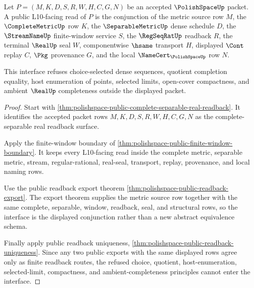 \begin{theorem}
\label{thm:polishspace-complete-separable-real-readback-public-interface}
Let $P=(M,K,D,S,R,W,H,C,G,N)$ be an accepted $\PolishSpaceUp$ packet. A public L10-facing read of $P$ is the conjunction of the metric source row $M$, the $\CompleteMetricUp$ row $K$, the $\SeparableMetricUp$ dense schedule $D$, the $\StreamNameUp$ finite-window service $S$, the $\RegSeqRatUp$ readback $R$, the terminal $\RealUp$ seal $W$, componentwise $\hsame$ transport $H$, displayed $\Cont$ replay $C$, $\Pkg$ provenance $G$, and the local $\NameCert_{\PolishSpaceUp}$ row $N$.

This interface refuses choice-selected dense sequences, quotient completion equality, host enumeration of points, selected limits, open-cover compactness, and ambient $\RealUp$ completeness outside the displayed packet.
\end{theorem}
\begin{proof}
Start with \autoref{thm:polishspace-public-complete-separable-real-readback}. It identifies the accepted packet rows $M,K,D,S,R,W,H,C,G,N$ as the complete-separable real readback surface.

Apply the finite-window boundary of \autoref{thm:polishspace-public-finite-window-boundary}. It keeps every L10-facing read inside the complete metric, separable metric, stream, regular-rational, real-seal, transport, replay, provenance, and local naming rows.

Use the public readback export theorem \autoref{thm:polishspace-public-readback-export}. The export theorem supplies the metric source row together with the same complete, separable, window, readback, seal, and structural rows, so the interface is the displayed conjunction rather than a new abstract equivalence schema.

Finally apply public readback uniqueness, \autoref{thm:polishspace-public-readback-uniqueness}. Since any two public exports with the same displayed rows agree only as finite readback routes, the refused choice, quotient, host-enumeration, selected-limit, compactness, and ambient-completeness principles cannot enter the interface.
\end{proof}

